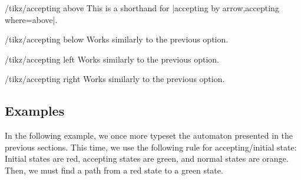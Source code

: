 \begin{stylekey}{/tikz/accepting above}
    This is a shorthand for |accepting by arrow,accepting where=above|.
\end{stylekey}

\begin{stylekey}{/tikz/accepting below}
    Works similarly to the previous option.
\end{stylekey}

\begin{stylekey}{/tikz/accepting left}
    Works similarly to the previous option.
\end{stylekey}

\begin{stylekey}{/tikz/accepting right}
    Works similarly to the previous option.
\end{stylekey}


\subsection{Examples}

In the following example, we once more typeset the automaton presented in the
previous sections. This time, we use the following rule for accepting/initial
state: Initial states are red, accepting states are green, and normal states
are orange. Then, we must find a path from a red state to a green state.
%
\begin{codeexample}[preamble={\usetikzlibrary{arrows,positioning,shadows}}]
\end{codeexample}

